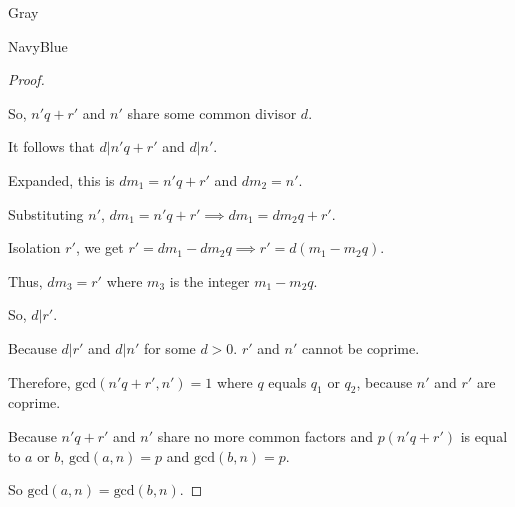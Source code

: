 \documentclass[12pt]{amsart}
\theoremstyle{named}
\newenvironment{prf}
{\medskip\begin{color}{Gray}\begin{framed}\begin{color}{NavyBlue}\begin{proof}[Proof]
\doublespacing}
{\end{proof}\end{color}\end{framed}\end{color}\medskip}
\theoremstyle{definition}
\begin{document}
\begin{prf}
\begin{adjustwidth}{2em}{0em}
		So, $n'q+r'$ and $n'$ share some common divisor $d$.

		It follows that $d|n'q+r'$ and $d|n'$.

		Expanded, this is $dm_1 = n'q+r'$ and $dm_2 = n'$.

		Substituting $n'$, $dm_1 = n'q+r' \implies dm_1 = dm_2q+r'$.

		Isolation $r'$, we get $r' = dm_1 - dm_2q \implies r' = d(m_1-m_2q)$.

		Thus, $dm_3 = r'$ where $m_3$ is the integer $m_1-m_2q$.

		So, $d|r'$. 

		Because $d|r'$ and $d|n'$ for some $d > 0$. $r'$ and $n'$ cannot
		be coprime.
	\end{adjustwidth}

	Therefore, $\text{gcd}(n'q+r',n') = 1$ where $q$ equals $q_1$ 
	or $q_2$, because $n'$ and $r'$ are coprime. 

	Because $n'q+r'$ and $n'$ share no more common factors and
	$p(n'q+r')$ is equal to $a$ or $b$, $\text{gcd}(a,n) = p$ and
	$\text{gcd}(b,n) = p$.

	So $\text{gcd}(a,n) = \text{gcd}(b,n)$. 


	
\end{prf}
\end{document}

